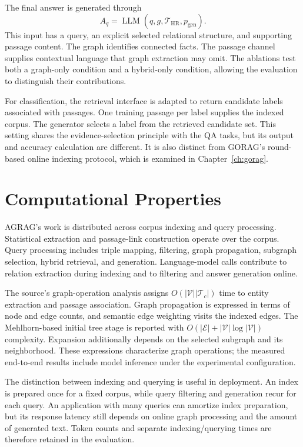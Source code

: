 The final answer is generated through
\begin{equation}
A_q=\operatorname{LLM}(q,g,\mathcal{T}_{\mathrm{HR}},p_{\mathrm{gen}}).
\label{eq:agrag:generation}
\end{equation}
This input has a query, an explicit selected relational structure, and supporting passage content. The graph identifies connected facts. The passage channel supplies contextual language that graph extraction may omit. The ablations test both a graph-only condition and a hybrid-only condition, allowing the evaluation to distinguish their contributions.

For classification, the retrieval interface is adapted to return candidate labels associated with passages. One training passage per label supplies the indexed corpus. The generator selects a label from the retrieved candidate set. This setting shares the evidence-selection principle with the QA tasks, but its output and accuracy calculation are different. It is also distinct from GORAG's round-based online indexing protocol, which is examined in Chapter~\ref{ch:gorag}.

\section{Computational Properties}
\label{sec:agrag:complexity}
AGRAG's work is distributed across corpus indexing and query processing. Statistical extraction and passage-link construction operate over the corpus. Query processing includes triple mapping, filtering, graph propagation, subgraph selection, hybrid retrieval, and generation. Language-model calls contribute to relation extraction during indexing and to filtering and answer generation online.

The source's graph-operation analysis assigns $O(|\mathcal{V}||\mathcal{T}_c|)$ time to entity extraction and passage association. Graph propagation is expressed in terms of node and edge counts, and semantic edge weighting visits the indexed edges. The Mehlhorn-based initial tree stage is reported with $O(|\mathcal{E}|+|\mathcal{V}|\log|\mathcal{V}|)$ complexity. Expansion additionally depends on the selected subgraph and its neighborhood. These expressions characterize graph operations; the measured end-to-end results include model inference under the experimental configuration.

The distinction between indexing and querying is useful in deployment. An index is prepared once for a fixed corpus, while query filtering and generation recur for each query. An application with many queries can amortize index preparation, but its response latency still depends on online graph processing and the amount of generated text. Token counts and separate indexing/querying times are therefore retained in the evaluation.

